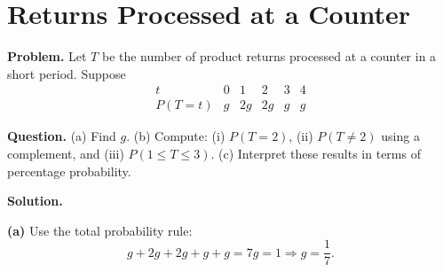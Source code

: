 		\section{Returns Processed at a Counter}
		
		\textbf{Problem.}
		Let $T$ be the number of product returns processed at a counter in a short period. Suppose
		\[
		\begin{array}{c|ccccc}
			t & 0 & 1 & 2 & 3 & 4\\
			\hline
			P(T=t) & g & 2g & 2g & g & g
		\end{array}
		\]
		
		\textbf{Question.}
		(a) Find $g$.
		(b) Compute: (i) $P(T=2)$, (ii) $P(T\ne 2)$ using a complement, and (iii) $P(1\le T\le 3)$.
		(c) Interpret these results in terms of percentage probability.
		
		\textbf{Solution.}

		\textbf{(a)} Use the total probability rule:
		\[
		g+2g+2g+g+g=7g=1\Rightarrow g=\frac{1}{7}.
		\]

